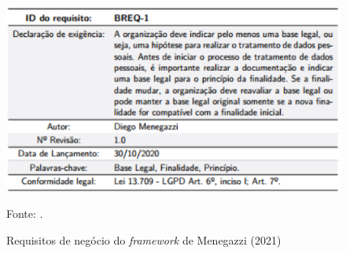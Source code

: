 \documentclass[
	12pt,				%
	openright,			%
	oneside,			%
	a4paper,			%
	english,			%
	french,				%
	spanish,			%
	brazil,				%
	]{abntex2}
\begin{document}
\begin{figure}[ht]
    \centering
    \caption{Requisitos de negócio do \textit{framework} de Menegazzi (2021)}
    \includegraphics[width=4.6in]{Images/10Menegazzi.png}
    \label{fig: MenegazziFigB}
    
    \centering \small Fonte: .
\end{figure}
\end{document}
